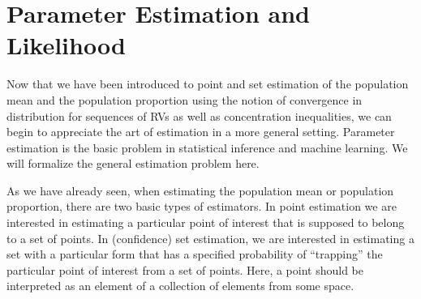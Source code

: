 \section{Parameter Estimation and Likelihood}\label{S:ParamEstAndLikelihood}

Now that we have been introduced to point and set estimation of the population mean and the population proportion using the notion of convergence in distribution for sequences of RVs as well as concentration inequalities, 
we can begin to appreciate the art of estimation in a more general setting.  
Parameter estimation is the basic problem in statistical inference and machine learning.  
We will formalize the general estimation problem here.  

As we have already seen, when estimating the population mean or population proportion, there are two basic types of estimators.  
In point estimation we are interested in estimating a particular point of interest that is supposed to belong to a set of points.  
In (confidence) set estimation, we are interested in estimating a set with a particular form that has a specified probability of ``trapping'' the particular point of interest from a set of points.  
Here, a point should be interpreted as an element of a collection of elements from some space.

